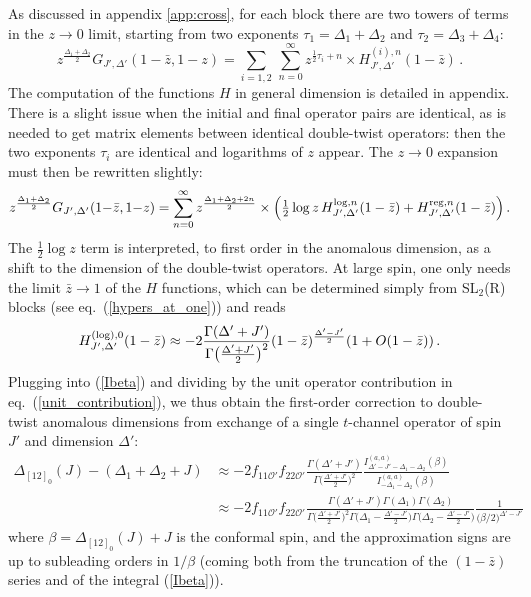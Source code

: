 \documentclass[11pt, reqno,preprint]{article}
\def\be{\begin{equation}}
\def\ee{\end{equation}}
\def\sreg{{\rm reg}}
\def\slog{{\rm log}}
\def\OO{\mathcal{O}}
\def\zbar{\bar{z}}
\def\j{J}
\begin{document}
As discussed in appendix \ref{app:cross}, for each block there are two towers of terms in the $z\to 0$ limit,
starting from two exponents
$\tau_1=\Delta_1+\Delta_2$ and $\tau_2=\Delta_3+\Delta_4$:
\be \label{cross_expansion_text}
z^{\frac{\Delta_1+\Delta_2}{2}}
G_{\j',\Delta'}(1{-}\zbar,1{-}z)=
 \sum_{i=1,2}\,
 \sum_{n=0}^\infty z^{\frac12\tau_i+n}\times H_{\j',\Delta'}^{(i),n}(1-\zbar)\,.
\ee
The computation of the functions $H$ in general dimension is detailed in appendix.
There is a slight issue when the initial and final operator pairs are identical, as is needed to get matrix elements between identical
double-twist operators: then the two exponents $\tau_i$ are identical and logarithms of $z$ appear.
The $z\to 0$ expansion  must then be rewritten slightly:
\be \label{cross_expansion_log_text}\begin{aligned}
z^{\frac{\Delta_1+\Delta_2}{2}}
G_{\j',\Delta'}(1{-}\zbar,1{-}z)
= \sum_{n=0}^\infty z^{\frac{\Delta_1+\Delta_2+2n}{2}}
\times \left(\tfrac12\log z\,H_{\j',\Delta'}^{\slog,n}(1-\zbar)+H_{\j',\Delta'}^{\sreg,n}(1-\zbar)\right).
\end{aligned}\ee
The $\frac12\log z$ term is interpreted, to first order in the anomalous dimension,
as a shift to the dimension of the double-twist operators. At large spin, one only needs the limit $\zbar\to 1$ of the $H$ functions, which
can be determined simply from SL${}_2$(R) blocks (see eq.~(\ref{hypers_at_one})) and reads
\be
H_{\j',\Delta'}^{({\rm log}),0}(1-\zbar) \approx -2\frac{\Gamma(\Delta'+\j')}{\Gamma\big(\tfrac{\Delta'+\j'}{2}\big)^2}(1-\zbar)^{\frac{\Delta'-\j'}{2}}(1+O(1-\zbar))\,.
\ee
Plugging into (\ref{Ibeta}) and dividing by the unit operator contribution in eq.~(\ref{unit_contribution}), we thus obtain the first-order
correction to double-twist anomalous dimensions from  exchange of a single $t$-channel operator of spin $\j'$ and dimension
$\Delta'$:
\be\begin{aligned}
\Delta_{[12]_0}(\j) -(\Delta_1+\Delta_2 +\j)  &\approx -2f_{11\OO'}f_{22\OO'}\frac{\Gamma(\Delta'+\j')}{\Gamma\big(\tfrac{\Delta'+\j'}{2}\big)^2}
\frac{I_{\Delta'-\j'-\Delta_1-\Delta_2}^{(a,a)}(\beta)}{I_{-\Delta_1-\Delta_2}^{(a,a)}(\beta)}
 \\ &\approx -2f_{11\OO'}f_{22\OO'}\frac{\Gamma(\Delta'+\j')\Gamma(\Delta_1)\Gamma(\Delta_2)}{\Gamma\big(\tfrac{\Delta'+\j'}{2}\big)^2
\Gamma\big(\Delta_1-\frac{\Delta'-\j'}{2}\big)\Gamma\big(\Delta_2-\frac{\Delta'-\j'}{2}\big)}\frac{1}{\big(\beta/2\big)^{\Delta'-\j'}}
\label{leading_term_1/j}
\end{aligned}\ee
where $\beta=\Delta_{[12]_0}(\j)+\j$ is the conformal spin, and the approximation signs are up to subleading orders in $1/\beta$
(coming both from the truncation of the $(1-\zbar)$ series and of the integral (\ref{Ibeta})).
\end{document}
